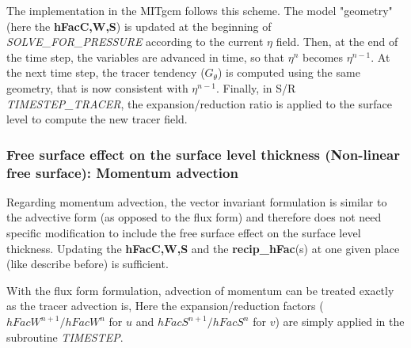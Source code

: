 The implementation in the MITgcm follows this scheme.
The model "geometry" (here the {\bf hFacC,W,S}) is updated
at the beginning of {\it SOLVE\_FOR\_PRESSURE}
according to the current $\eta$ field.
Then, at the end of the time step, the variables are
advanced in time, so that $\eta^n$ becomes $\eta^{n-1}$.
At the next time step, the tracer tendency ($G_\theta$) is computed 
using the same geometry, that is now consistent with
$\eta^{n-1}$.
Finally, in S/R {\it TIMESTEP\_TRACER}, the expansion/reduction
ratio is applied to the surface level to compute the new tracer field.

\subsubsection{Free surface effect on the surface level thickness
(Non-linear free surface): Momentum advection}     

Regarding momentum advection,
the vector invariant formulation is similar to the
advective form (as opposed to the flux form) and therefore
does not need specific modification to include the 
free surface effect on the surface level thickness.
Updating the {\bf hFacC,W,S} and the {\bf recip\_hFac}(s) 
at one given place (like describe before) is sufficient.

With the flux form formulation, advection of momentum
can be treated exactly as the tracer advection is,
Here the expansion/reduction factors ($hFacW^{n+1}/hFacW^n$ for $u$
and $hFacS^{n+1}/hFacS^n$ for $v$) are simply applied in the
subroutine {\it TIMESTEP}.

